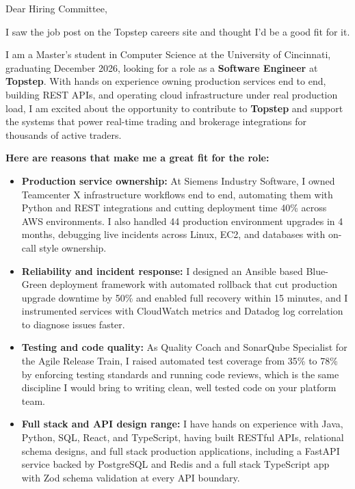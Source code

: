 \documentclass[11pt]{letter}
\date{}
\begin{document}
\begin{letter}{}

\opening{Dear Hiring Committee,}

I saw the job post on the Topstep careers site and thought I'd be a good fit for it.

I am a Master's student in Computer Science at the University of Cincinnati, graduating December 2026, looking for a role as a \textbf{Software Engineer} at \textbf{Topstep}. With hands on experience owning production services end to end, building REST APIs, and operating cloud infrastructure under real production load, I am excited about the opportunity to contribute to \textbf{Topstep} and support the systems that power real-time trading and brokerage integrations for thousands of active traders.

\textbf{Here are reasons that make me a great fit for the role:}

\begin{itemize}[leftmargin=*, itemsep=0.45em]
    \item \textbf{Production service ownership:} At Siemens Industry Software, I owned Teamcenter X infrastructure workflows end to end, automating them with Python and REST integrations and cutting deployment time 40\% across AWS environments. I also handled 44 production environment upgrades in 4 months, debugging live incidents across Linux, EC2, and databases with on-call style ownership.

    \item \textbf{Reliability and incident response:} I designed an Ansible based Blue-Green deployment framework with automated rollback that cut production upgrade downtime by 50\% and enabled full recovery within 15 minutes, and I instrumented services with CloudWatch metrics and Datadog log correlation to diagnose issues faster.

    \item \textbf{Testing and code quality:} As Quality Coach and SonarQube Specialist for the Agile Release Train, I raised automated test coverage from 35\% to 78\% by enforcing testing standards and running code reviews, which is the same discipline I would bring to writing clean, well tested code on your platform team.

    \item \textbf{Full stack and API design range:} I have hands on experience with Java, Python, SQL, React, and TypeScript, having built RESTful APIs, relational schema designs, and full stack production applications, including a FastAPI service backed by PostgreSQL and Redis and a full stack TypeScript app with Zod schema validation at every API boundary.
\end{itemize}


\end{letter}
\end{document}
